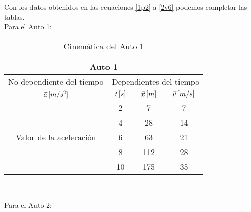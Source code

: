 \documentclass[letterpaper, 12pt]{article}
\begin{document}
\begin{enumerate}
\begin{enumerate}
            Con los datos obtenidos en las ecuaciones \ref{1p2} a \ref{2v6} podemos completar las tablas.\\
            
            Para el Auto 1: 
            
            \begin{table}[H]
            \centering
                    \begin{tabular}{c|c|c|c|c|c}\hline \hline
                       \multicolumn{6}{c}{Auto 1}\\\hline
                       \multicolumn{3}{l|}{No dependiente del tiempo} & \multicolumn{3}{|l}{Dependientes del tiempo}\\\hline
                       \multicolumn{3}{c|}{$\vec{a}\thinspace [m/s^{2}]$} & {$t\thinspace[s]$} & {$\vec{x}\thinspace[m]$} & {$\vec{v}\thinspace[m/s]$}\\\hline
                       \multicolumn{3}{c|}{} & 2 & 7 & 7 \\\cline{4-6}
                       \multicolumn{3}{c|}{} & 4 & 28 & 14 \\\cline{4-6}
                       \multicolumn{3}{c|}{Valor de la aceleración} & 6 & 63 & 21 \\\cline{4-6}
                       \multicolumn{3}{c|}{} & 8 & 112 & 28 \\\cline{4-6}
                       \multicolumn{3}{c|}{} & 10 & 175 & 35 \\\hline \hline
                    \end{tabular}\\
                    \caption{Cinemática del Auto 1}
                    \label{Cuadro 1: Cinemática del Auto 1)}
            \end{table}
            
            Para el Auto 2: 
            

\end{enumerate}
\end{enumerate}
\end{document}
